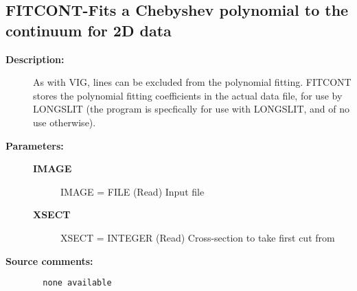 \subsection{FITCONT-\label{FITCONT}Fits a Chebyshev polynomial to the continuum for 2D data}
\begin{description}

\item [{\bf Description:}]
   As with VIG, lines can be excluded from the polynomial
   fitting. FITCONT stores the polynomial fitting coefficients in
   the actual data file, for use by LONGSLIT (the program is specfically
   for use with LONGSLIT, and of no use otherwise).

\item [{\bf Parameters:}]
\begin{description}
\item [{\bf IMAGE}]
   IMAGE = FILE (Read)
        Input file
\item [{\bf XSECT}]
   XSECT = INTEGER (Read)
        Cross-section to take first cut from
\end{description}

\item [{\bf Source comments:}]
\begin{verbatim}
  none available

\end{verbatim}
\end{description}
